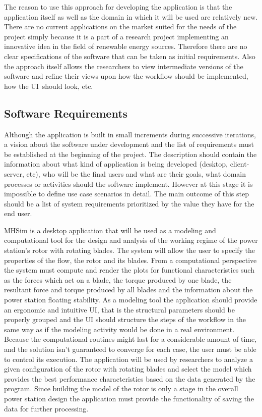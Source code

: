 The reason to use this approach for developing the application is that the
application itself as well as the domain in which it will be used are
relatively new. There are no current applications on the market suited for
the needs of the project simply because it is a part of a research project
implementing an innovative idea in the field of renewable energy sources.
Therefore there are no clear specifications of the software that can be
taken as initial requirements. Also the approach itself allows the
researchers to view intermediate versions of the software and refine their
views upon how the workflow should be implemented, how the UI\ should look,
etc.

\subsection{Software Requirements}

Although the application is built in small increments during successive
iterations, a vision about the software under development and the list of
requirements must be established at the beginning of the project. The
description should contain the information about what kind of application is
being developed (desktop, client-server, etc), who will be the final users
and what are their goals, what domain processes or activities should the
software implement. However at this stage it is impossible to define use
case scenarios in detail. The main outcome of this step should be a list of
system requirements prioritized by the value they have for the end user.

MHSim is a desktop application that will be used as a modeling and
computational tool for the design and analysis of the working regime of the
power station's rotor with rotating blades. The system will allow the user
to specify the properties of the flow, the rotor and its blades. From a
computational perspective the system must compute and render the plots for
functional characteristics such as the forces which act on a blade, the
torque produced by one blade, the resultant force and torque produced by all
blades and the information about the power station floating stability. As a
modeling tool the application should provide an ergonomic and intuitive UI,
that is the structural parameters should be properly grouped and the UI
should structure the steps of the workflow in the same way as if the
modeling activity would be done in a real environment. Because the
computational routines might last for a considerable amount of time, and the
solution isn't guaranteed to converge for each case, the user must be able
to control its execution. The application will be used by researchers to
analyze a given configuration of the rotor with rotating blades and select
the model which provides the best performance characteristics based on the
data generated by the program. Since building the model of the rotor is only
a stage in the overall power station design the application must provide the
functionality of saving the data for further processing.

